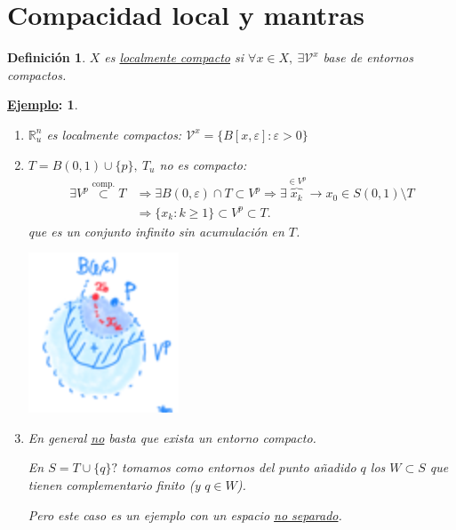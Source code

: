 \documentclass[10pt,a4paper,openright]{book}
\theoremstyle{break}
\newtheorem*{defi}{Definición}
\newtheorem*{ej}{\underline{Ejemplo}:}
\begin{document}
\section{Compacidad local y mantras}%
\label{sec:compacidad_local_y_mantras}
\begin{defi}
$X$ es \underline{localmente compacto} si $\forall x \in X,\ \exists \mathcal{V}^x$ base de entornos compactos.
\end{defi}

\begin{ej}
\begin{enumerate}
    \item $\mathbb{R}_u^n$ es localmente compactos: $\mathcal{V}^x = \{B\left[ x, \varepsilon \right] : \varepsilon > 0\}$

    \item $T = B\left( 0, 1 \right) \cup \{p\},\ T_u$ no es compacto:
    \begin{align*}
        \exists V^p \stackrel{\text{comp.}}{\subset} T &\Rightarrow \exists B\left( 0, \varepsilon \right) \cap T \subset V^p \Rightarrow \exists \overbrace{x_k}^{\in V^p} \rightarrow x_0 \in S\left( 0, 1 \right) \setminus T\\
       &\Rightarrow \{x_k : k \ge 1\} \subset V^p \subset T 
    .\end{align*}
    que es un conjunto infinito sin acumulación en $T$.
    \begin{center}
        \includegraphics[scale=0.3]{images/loc_comp_ej_2} 
    \end{center}

    \item En general \underline{no} basta que exista un entorno compacto.

    En $S = T \cup \{q\}?$ tomamos como entornos del punto añadido $q$ los $W \subset S$ que tienen complementario finito (y $q \in W$).

    Pero este caso es un ejemplo con un espacio \underline{no separado}.
\end{enumerate}
\end{ej}
\end{document}
